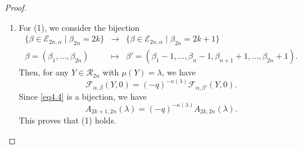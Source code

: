 \documentclass[11pt,oneside]{amsart}
\theoremstyle{plain}
\theoremstyle{definition}
\theoremstyle{remark}
\newcommand{\CE}{{\mathcal E}}
\newcommand{\CF}{{\mathcal F}}
\newcommand{\CR}{{\mathcal R}}
\numberwithin{equation}{section}
\begin{document}
	\begin{proof}
		\begin{enumerate}\label{eq4.4}
			\item For (1), we consider the bijection
			\begin{equation}\begin{array}{ccc}
					\lbrace \beta \in \CE_{2n,\alpha} \mid \beta_{2n}=2k \rbrace & \longrightarrow & \lbrace \beta \in \CE_{2n,\alpha} \mid \beta_{2n}=2k+1 \rbrace\\
					\beta =(\beta_1,\dots,\beta_{2n}) & \mapsto & \beta'=(\beta_1-1,\dots,\beta_n-1,\beta_{n+1}+1,\dots,\beta_{2n}+1).
				\end{array}
			\end{equation}
			Then, for any $Y \in \CR_{2n}$ with $\mu(Y)=\lambda$, we have
			\begin{equation*} 
				\CF_{\alpha,\beta}(Y,0)=(-q)^{-\kappa(\lambda)}	\CF_{\alpha,\beta'}(Y,0).
			\end{equation*}
			Since \eqref{eq4.4} is a bijection, we have
			\begin{equation*}
				A_{2k+1,2n}(\lambda)=(-q)^{-\kappa(\lambda)}A_{2k,2n}(\lambda).
			\end{equation*}
			This proves that (1) holds.
			

\end{enumerate}
\end{proof}
\end{document}
